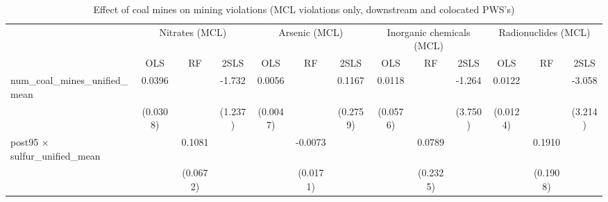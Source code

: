 
\begin{table}[htbp]
   
   \caption{\label{2sls_dwnstrmcolocate_minevio_mcl} Effect of coal mines on mining violations (MCL violations only, downstream and colocated PWS's)}
   \bigskip
   
   \centering
   
   \begin{adjustbox}{width = \textwidth, center}
      
      
      \begin{tabular}{lcccccccccccc}
         \toprule
         
          & \multicolumn{3}{c}{Nitrates (MCL)} & \multicolumn{3}{c}{Arsenic (MCL)} & \multicolumn{3}{c}{Inorganic chemicals (MCL)} & \multicolumn{3}{c}{Radionuclides (MCL)}\\
         
                                                                            & OLS                   & RF            & 2SLS          & OLS                   & RF                    & 2SLS                  & OLS                   & RF                    & 2SLS                  & OLS                   & RF            & 2SLS\\  
         
         \midrule 
         num\_coal\_mines\_unified\_mean                                    & 0.0396                &               & -1.732        & 0.0056                &                       & 0.1167                & 0.0118                &                       & -1.264                & 0.0122                &               & -3.058\\   
                                                                            & (0.0308)              &               & (1.237)       & (0.0047)              &                       & (0.2759)              & (0.0576)              &                       & (3.750)               & (0.0124)              &               & (3.214)\\   
         post95 $\times$ sulfur\_unified\_mean                              &                       & 0.1081        &               &                       & -0.0073               &                       &                       & 0.0789                &                       &                       & 0.1910        &   \\   
                                                                            &                       & (0.0672)      &               &                       & (0.0171)              &                       &                       & (0.2325)              &                       &                       & (0.1908)      &   \\   
         

\end{tabular}
\end{adjustbox}
\end{table}
